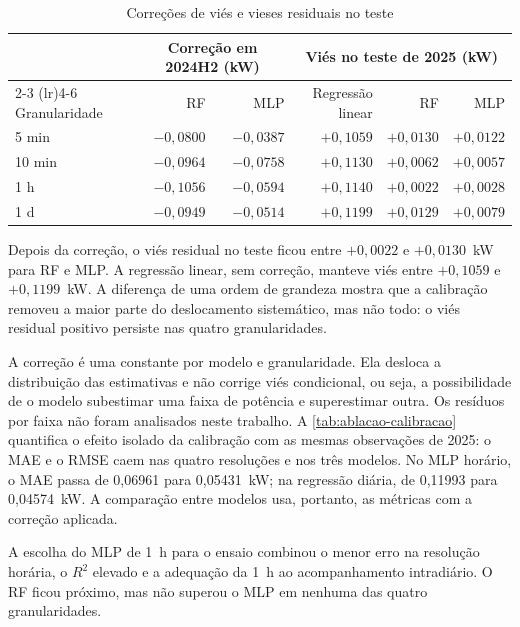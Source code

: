 \begin{table}[htbp]
    \centering
    \small
    \caption{Correções de viés e vieses residuais no teste}
    \label{tab:resultados-correcoes}
    \begin{tabular}{lrrrrr}
        \toprule
        & \multicolumn{2}{c}{Correção em 2024H2 (kW)} & \multicolumn{3}{c}{Viés no teste de 2025 (kW)} \\
        \cmidrule(lr){2-3} \cmidrule(lr){4-6}
        Granularidade & RF & MLP & Regressão linear & RF & MLP \\
        \midrule
        5 min  & $-0,0800$ & $-0,0387$ & $+0,1059$ & $+0,0130$ & $+0,0122$ \\
        10 min & $-0,0964$ & $-0,0758$ & $+0,1130$ & $+0,0062$ & $+0,0057$ \\
        1 h    & $-0,1056$ & $-0,0594$ & $+0,1140$ & $+0,0022$ & $+0,0028$ \\
        1 d    & $-0,0949$ & $-0,0514$ & $+0,1199$ & $+0,0129$ & $+0,0079$ \\
        \bottomrule
    \end{tabular}
\end{table}

Depois da correção, o viés residual no teste ficou entre $+0,0022$ e
$+0,0130$~kW para RF e MLP. A regressão linear, sem correção, manteve
viés entre $+0,1059$ e $+0,1199$~kW. A diferença de uma ordem de
grandeza mostra que a calibração removeu a maior parte do deslocamento
sistemático, mas não todo: o viés residual positivo persiste nas quatro
granularidades.

A correção é uma constante por modelo e granularidade. Ela desloca a
distribuição das estimativas e não corrige viés condicional, ou seja, a
possibilidade de o modelo subestimar uma faixa de potência e superestimar
outra. Os resíduos por faixa não foram analisados neste trabalho. A
\cref{tab:ablacao-calibracao} quantifica o efeito isolado da calibração com
as mesmas observações de 2025: o MAE e o RMSE caem nas quatro resoluções e
nos três modelos. No MLP horário, o MAE passa de 0,06961 para 0,05431~kW; na
regressão diária, de 0,11993 para 0,04574~kW. A comparação entre modelos
usa, portanto, as métricas com a correção aplicada.

A escolha do MLP de 1~h para o ensaio combinou o menor erro na
resolução horária, o $R^2$ elevado e a adequação da 1~h ao
acompanhamento intradiário. O RF ficou próximo, mas não superou o MLP
em nenhuma das quatro granularidades.

